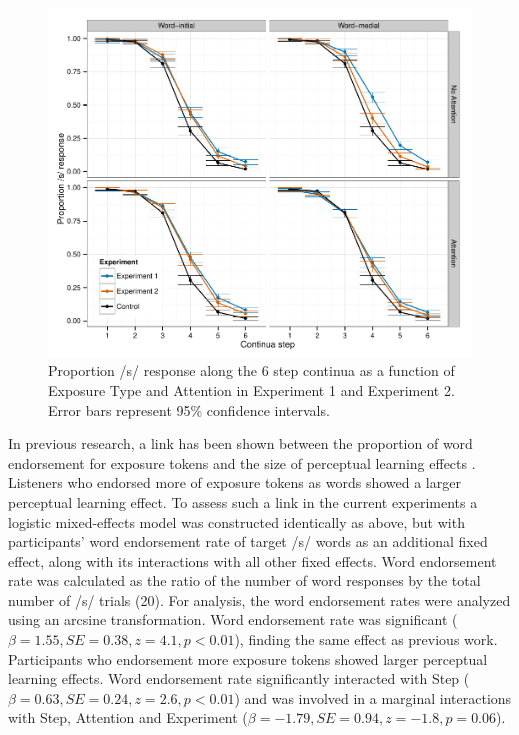 \begin{figure}[!ht]
\caption{Proportion /s/ response along the 6 step continua as a function of Exposure Type and Attention in Experiment 1 and Experiment 2. Error bars represent 95\% confidence intervals.}
\label{fig:exp12categ}
\begin{center}
\includegraphics[width=\textwidth]{graphs/exp12_categresults}
\end{center}
\end{figure}

In previous research, a link has been shown between the proportion of word endorsement for exposure tokens and the size of perceptual learning effects \citep{Scharenborg2013}.
Listeners who endorsed more of exposure tokens as words showed a larger perceptual learning effect.
To assess such a link in the current experiments a logistic mixed-effects model was constructed identically as above, but with participants' word endorsement rate of target /s/ words as an additional fixed effect, along with its interactions with all other fixed effects.
Word endorsement rate was calculated as the ratio of the number of word responses by the total number of /s/ trials (20).
For analysis, the word endorsement rates were analyzed using an arcsine transformation.
Word endorsement rate was significant ($\beta = 1.55, SE = 0.38, z = 4.1, p < 0.01$), finding the same effect as previous work.
Participants who endorsement more exposure tokens showed larger perceptual learning effects.
Word endorsement rate significantly interacted with Step ($\beta = 0.63, SE = 0.24, z = 2.6, p < 0.01$) and was involved in a marginal  interactions with Step, Attention and Experiment ($\beta = -1.79, SE = 0.94, z = -1.8, p = 0.06$).

